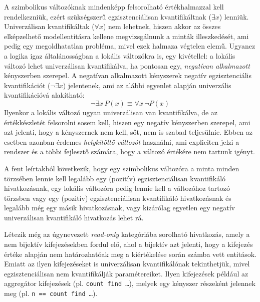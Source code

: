 A szimbolikus változóknak mindenképp felsorolható értékhalmazzal kell rendelkezniük, ezért szükségszerű egzisztenciálisan kvantifikáltnak ($\exists x$) lenniük.
Univerzálisan kvantifikáltak ($\forall x$) nem lehetnek, hiszen akkor az összes elképzelhető modellentitásra kellene megvizsgálnunk a minták illeszkedését, ami pedig egy megoldhatatlan probléma, mivel ezek halmaza végtelen elemű.
Ugyanez a logika igaz általánosságban a lokális változókra is, egy kivétellel: a lokális változó lehet univerzálisan kvantifikálva, ha pontosan egy, \emph{negatívan alkalmazott} kényszerben szerepel.
A negatívan alkalmazott kényszerek negatív egzisztenciális kvantifikációt ($\neg\exists x$) jelentenek, ami az alábbi egyenlet alapján univerzális kvantifikációvá alakítható:
\begin{equation} \label{eq:negexiststoforall}
\neg\exists x\, P(x) \equiv \forall x\, \neg P(x)
\end{equation}
Ilyenkor a lokális változó ugyan univerzálisan van kvantifikálva, de az értékkészletét felsorolni sosem kell, hiszen egy negatív kényszerben szerepel, ami azt jelenti, hogy a kényszernek nem kell, sőt, nem is szabad teljesülnie. Ebben az esetben azonban érdemes \emph{helykitöltő változót} használni, ami expliciten jelzi a rendszer és a többi fejlesztő számára, hogy a változó értékére nem tartunk igényt.

A fent leírtakból következik, hogy egy szimbolikus változóra a minta minden törzsében lennie kell legalább egy (pozitív) egzisztenciálisan kvantifikáló hivatkozásnak, egy lokális változóra pedig lennie kell a változóhoz tartozó törzsben vagy egy (pozitív) egzisztenciálisan kvantifikáló hivatkozásnak és legalább még egy másik hivatkozásnak, vagy kizárólag egyetlen egy negatív univerzálisan kvantifikáló hivatkozás lehet rá.

Létezik még az úgynevezett \emph{read-only} kategóriába sorolható hivatkozás, amely a nem bijektív kifejezésekben fordul elő, ahol a bijektív azt jelenti, hogy a kifejezés értéke alapján nem határozhatóak meg a kiértékelése során számba vett entitások.
Emiatt az ilyen kifejezéseket is univerzálisan kvantifikálónak tekinthetjük, mivel egzisztenciálisan nem kvantifikálják paramétereiket.
Ilyen kifejezések például az aggregátor kifejezések (pl. \mbox{\texttt{count find \ldots}}), melyek egy kényszer részeként jelennek meg (pl. \mbox{\texttt{n == count find \ldots}}).

